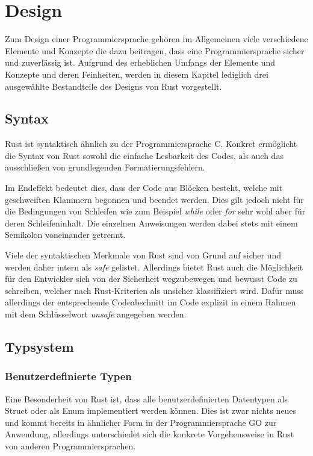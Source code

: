 \newenvironment{code}{\captionsetup{type=listing}}{}
\chapter{Design}
Zum Design einer Programmiersprache gehören im Allgemeinen viele verschiedene Elemente und Konzepte die dazu beitragen, dass eine Programmiersprache sicher und zuverlässig ist. Aufgrund des erheblichen Umfangs der Elemente und Konzepte und deren Feinheiten, werden in diesem Kapitel lediglich drei ausgewählte Bestandteile des Designs von Rust vorgestellt. 
\section{Syntax}
Rust ist syntaktisch ähnlich zu der Programmiersprache C. Konkret ermöglicht die Syntax von Rust sowohl die einfache Lesbarkeit des Codes, als auch das ausschließen von grundlegenden Formatierungsfehlern. \autocite{rust-the-book}

Im Endeffekt bedeutet dies, dass der Code aus Blöcken besteht, welche mit geschweiften Klammern begonnen und beendet werden. Dies gilt jedoch nicht für die Bedingungen von Schleifen wie zum Beispiel \textit{while} oder \textit{for} sehr wohl aber für deren Schleifeninhalt. Die einzelnen Anweisungen werden dabei stets mit einem Semikolon voneinander getrennt.  \autocite{rust-the-book}\autocite{rust-by-example}\autocite{rust-wiki}

Viele der syntaktischen Merkmale von Rust sind von Grund auf sicher und werden daher intern als \textit{safe} gelistet. Allerdings bietet Rust auch die Möglichkeit für den Entwickler sich von der Sicherheit wegzubewegen und bewusst Code zu schreiben, welcher nach Rust-Kriterien als unsicher klassifiziert wird. Dafür muss allerdings der entsprechende Codeabschnitt im Code explizit in einem Rahmen mit dem Schlüsselwort \textit{unsafe} angegeben werden.\autocite{rust-the-book}\autocite{rust-by-example}\autocite{rust-wiki}

\section{Typsystem}
\subsection{Benutzerdefinierte Typen}
Eine Besonderheit von Rust ist, dass alle benutzerdefinierten Datentypen als Struct oder als Enum implementiert werden können. Dies ist zwar nichts neues und kommt bereits in ähnlicher Form in der Programmiersprache GO zur Anwendung, allerdings unterschiedet sich die konkrete Vorgehensweise in Rust von anderen Programmiersprachen.

